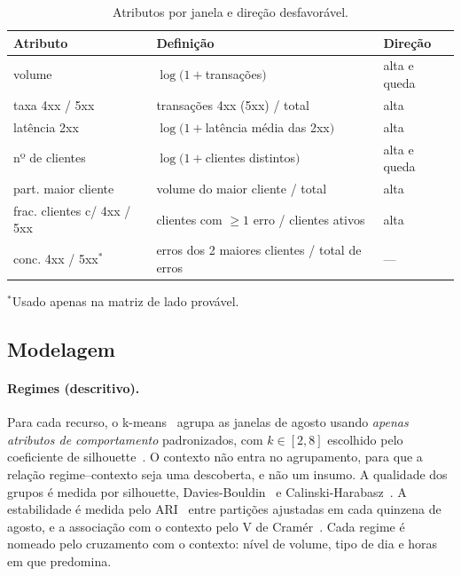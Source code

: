 \documentclass[sigconf,nonacm]{acmart}
\begin{document}
\begin{table}[t]
  \caption{Atributos por janela e direção desfavorável.}
  \label{tab:atributos}
  \small
  \begin{tabular}{p{}p{}p{}}
    \toprule
    Atributo & Definição & Direção \\
    \midrule
    volume & $\log(1+$transações$)$ & alta e queda \\
    taxa 4xx / 5xx & transações 4xx (5xx) / total & alta \\
    latência 2xx & $\log(1+$latência média das 2xx$)$ & alta \\
    nº de clientes & $\log(1+$clientes distintos$)$ & alta e queda \\
    part. maior cliente & volume do maior cliente / total & alta \\
    frac. clientes c/ 4xx / 5xx & clientes com $\geq 1$ erro / clientes ativos & alta \\
    \midrule
    conc. 4xx / 5xx$^\ast$ & erros dos 2 maiores clientes / total de erros & --- \\
    \bottomrule
  \end{tabular}
  \par\smallskip\footnotesize $^\ast$Usado apenas na matriz de lado provável.
\end{table}

\subsection{Modelagem}

\paragraph{Regimes (descritivo).} Para cada recurso, o k-means~\citep{lloyd1982kmeans} agrupa as janelas de agosto usando \emph{apenas atributos de comportamento} padronizados, com $k \in [2,8]$ escolhido pelo coeficiente de silhouette~\citep{rousseeuw1987silhouette}. O contexto não entra no agrupamento, para que a relação regime--contexto seja uma descoberta, e não um insumo. A qualidade dos grupos é medida por silhouette, Davies-Bouldin~\citep{davies1979cluster} e Calinski-Harabasz~\citep{calinski1974dendrite}. A estabilidade é medida pelo ARI~\citep{hubert1985ari} entre partições ajustadas em cada quinzena de agosto, e a associação com o contexto pelo V de Cramér~\citep{cramer1946mathematical}. Cada regime é nomeado pelo cruzamento com o contexto: nível de volume, tipo de dia e horas em que predomina.
\end{document}
